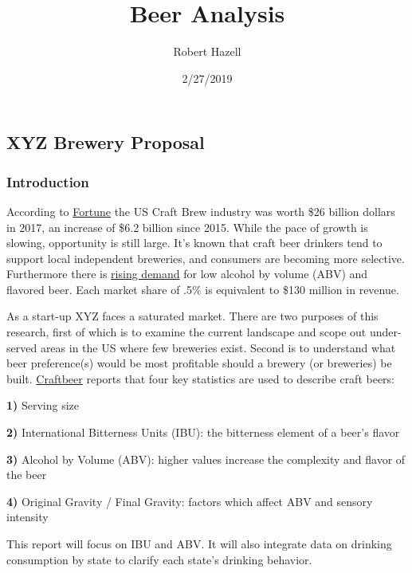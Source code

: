 \documentclass[]{article}
\title{Beer Analysis}
\author{Robert Hazell}
\date{2/27/2019}
\begin{document}
\maketitle

\hypertarget{xyz-brewery-proposal}{%
\subsection{XYZ Brewery Proposal}\label{xyz-brewery-proposal}}

\hypertarget{introduction}{%
\subsubsection{Introduction}\label{introduction}}

According to
\href{http://fortune.com/2018/03/27/craft-beer-2017-sales/}{Fortune} the
US Craft Brew industry was worth \$26 billion dollars in 2017, an
increase of \$6.2 billion since 2015. While the pace of growth is
slowing, opportunity is still large. It's known that craft beer drinkers
tend to support local independent breweries, and consumers are becoming
more selective. Furthermore there is
\href{https://www.grandviewresearch.com/press-release/global-craft-beer-market}{rising
demand} for low alcohol by volume (ABV) and flavored beer. Each market
share of .5\% is equivalent to \$130 million in revenue.

As a start-up XYZ faces a saturated market. There are two purposes of
this research, first of which is to examine the current landscape and
scope out under-served areas in the US where few breweries exist. Second
is to understand what beer preference(s) would be most profitable should
a brewery (or breweries) be built.
\href{https://www.craftbeer.com/craft-beer-muses/craft-beer-by-the-numbers}{Craftbeer}
reports that four key statistics are used to describe craft beers:

\textbf{1)} Serving size

\textbf{2)} International Bitterness Units (IBU): the bitterness element
of a beer's flavor

\textbf{3)} Alcohol by Volume (ABV): higher values increase the
complexity and flavor of the beer

\textbf{4)} Original Gravity / Final Gravity: factors which affect ABV
and sensory intensity

This report will focus on IBU and ABV. It will also integrate data on
drinking consumption by state to clarify each state's drinking behavior.
\end{document}
